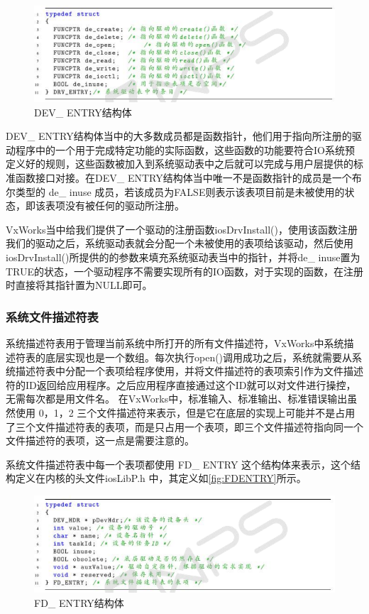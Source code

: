 \begin{figure}[!h]
\centering
\includegraphics[width=1.0\textwidth]{./graphics/DEVENTRY.pdf}
\caption{DEV\_ ENTRY结构体}\label{fig:DEVENTRY}
\end{figure}

	DEV\_ ENTRY结构体当中的大多数成员都是函数指针，他们用于指向所注册的驱动程序中的一个用于完成特定功能的实际函数，这些函数的功能要符合IO系统预定义好的规则，这些函数被加入到系统驱动表中之后就可以完成与用户层提供的标准函数接口对接\cite{VxWorks内核解读}\cite{VxWorksDriverAPI}\cite{Wind2003VxWorks}。在DEV\_ ENTRY结构体当中唯一不是函数指针的成员是一个布尔类型的 de\_ inuse 成员，若该成员为FALSE则表示该表项目前是未被使用的状态，即该表项没有被任何的驱动所注册。

	VxWorks当中给我们提供了一个驱动的注册函数iosDrvInstall()，使用该函数注册我们的驱动之后，系统驱动表就会分配一个未被使用的表项给该驱动，然后使用iosDrvInstall()所提供的的参数来填充系统驱动表当中的指针，并将de\_ inuse置为TRUE的状态，一个驱动程序不需要实现所有的IO函数，对于实现的函数，在注册时直接将其指针置为NULL即可。


\subsubsection{系统文件描述符表}
	系统描述符表用于管理当前系统中所打开的所有文件描述符，VxWorks中系统描述符表的底层实现也是一个数组。每次执行open()调用成功之后，系统就需要从系统描述符表中分配一个表项给程序使用，并将文件描述符的表项索引作为文件描述符的ID返回给应用程序。之后应用程序直接通过这个ID就可以对文件进行操控，无需每次都是用文件名。
	在VxWorks中，标准输入、标准输出、标准错误输出虽然使用 0，1，2 三个文件描述符来表示，但是它在底层的实现上可能并不是占用了三个文件描述符表的表项，而是只占用一个表项，即三个文件描述符指向同一个文件描述符的表项\cite{VxWorks内核解读}\cite{An2003Implementation}，这一点是需要注意的。
		
	
系统文件描述符表中每一个表项都使用 FD\_ ENTRY 这个结构体来表示，这个结构定义在内核的头文件iosLibP.h 中，其定义如\autoref{fig:FDENTRY}所示。


\begin{figure}[!h]
\centering
\includegraphics[width=1.0\textwidth]{./graphics/FDENTRY.pdf}
\caption{FD\_ ENTRY结构体}\label{fig:FDENTRY}
\end{figure}


